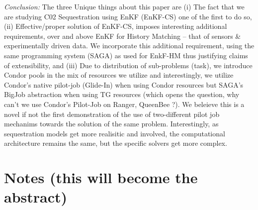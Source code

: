 \documentclass[conference,final]{IEEEtran}
\begin{document}
{\it Conclusion: } The three Unique things about this paper are (i) The fact that we are studying C02 Sequestration using EnKF (EnKF-CS) one of the first to do so, (ii) Effective/proper solution of EnKF-CS, imposes interesting additional requirements, over and above EnKF for History Matching -- that of sensors \& experimentally driven data. We incorporate this additional requirement, using the same programming system (SAGA) as used for EnkF-HM thus justifying claims of extensibility, and (iii) Due to distribution of sub-problems (task), we introduce Condor pools in the mix of resources we utilize and interestingly, we utilize Condor's native pilot-job (Glide-In) when using Condor resources but SAGA's BigJob abstraction when using TG resources (which opens the question, why can't we use Condor's Pilot-Job on Ranger, QueenBee ?). We beleieve this is a novel if not the first demonstration of the use of two-different pilot job mechanims towards the solution of the same problem. Interestingly, as sequestration models get more realisitic and involved, the computational architecture remains the same, but the specific solvers get more complex.


\section*{Notes (this will become the abstract)}
\end{document}
